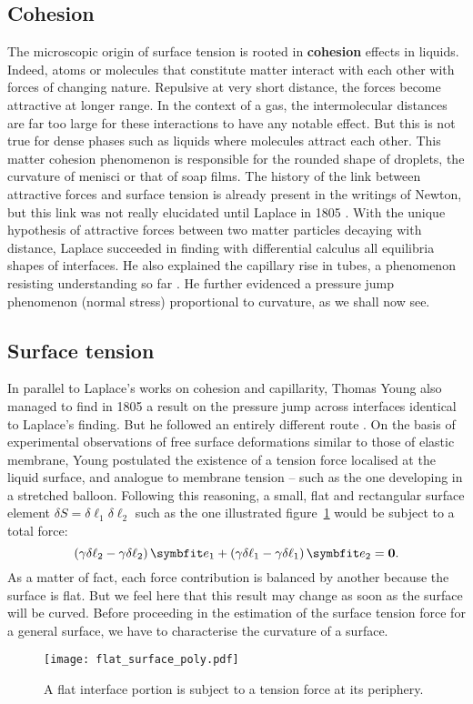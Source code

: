 \subsection{Cohesion}
The microscopic origin of surface tension is rooted in \textbf{cohesion} effects in liquids. Indeed, atoms or molecules that constitute matter interact with each other with forces of changing nature. Repulsive at very short distance, the forces become attractive at longer range. In the context of a gas, the intermolecular distances are far too large for these interactions to have any notable effect. But this is not true for dense phases such as liquids where molecules attract each other. This matter cohesion phenomenon is responsible for the rounded shape of droplets, the curvature of menisci or that of soap films. The history of the link between attractive forces and surface tension is already present in the writings of Newton, but this link was not really elucidated until Laplace in 1805 \citep{Laplace1805}. With the unique hypothesis of attractive forces between two matter particles decaying with distance, Laplace succeeded in finding with differential calculus all equilibria shapes of interfaces. He also explained the capillary rise in tubes, a phenomenon resisting understanding so far \citep{Rowlinson2005}. He further evidenced a pressure jump phenomenon (normal stress) proportional to curvature, as we shall now see.
\subsection{Surface tension}
In parallel to Laplace's works on cohesion and capillarity, Thomas Young also managed to find in 1805 a result on the pressure jump across interfaces identical to Laplace's finding. But he followed an entirely different route \citep{Young1805}. On the basis of experimental observations of free surface deformations similar to those of elastic membrane, Young postulated the existence of a tension force localised at the liquid surface, and analogue to membrane tension -- such as the one developing in a stretched balloon. Following this reasoning, a small, flat and rectangular surface element $\delta S = \delta \ell_1 \delta \ell_2$ such as the one illustrated figure~\ref{fig:flat_surface} would be subject to a total force:
$$
\lp \gamma \delta \ell_2 - \gamma \delta \ell_2 \rp \be_1 + \lp \gamma \delta \ell_1 - \gamma \delta \ell_1 \rp \be_2 = \boldsymbol 0.
$$
As a matter of fact, each force contribution is balanced by another because the surface is flat. But we feel here that this result may change as soon as the surface will be curved. Before proceeding in the estimation of the surface tension force for a general surface, we have to characterise the curvature of a surface.
\begin{figure}[htbp]
\begin{center}
\texttt{[image: flat\_surface\_poly.pdf]} \end{center}
\caption{A flat interface portion is subject to a tension force at its periphery.}
\label{fig:flat_surface}
\end{figure}


